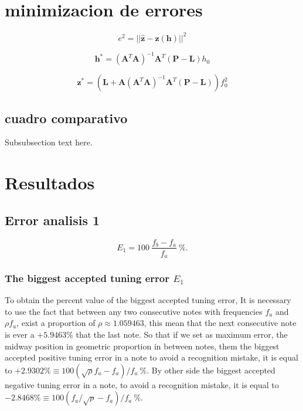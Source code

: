 \documentclass{article}
\begin{document}
\section{minimizacion de errores}

\begin{equation}
e^2= || \mathbf{\hat{z}} - \mathbf{z}(\mathbf{h}) ||^2
\end{equation}

\begin{equation}
\mathbf{h}^{*}=
 \left(\mathbf{A}^T\mathbf{A}\right)^{-1}\mathbf{A}^T
 \left(\mathbf{P}-\mathbf{L}\right)
h_0
\end{equation}


\begin{equation}
\mathbf{z}^{*}=
\left(\mathbf{L}
+\mathbf{A}\left(\mathbf{A}^T\mathbf{A}\right)^{-1}\mathbf{A}^T
 \left(\mathbf{P}-\mathbf{L}\right) \right)
f_0^2
\end{equation}

\subsection{cuadro comparativo}
Subsubsection text here.



\section{Resultados}

\subsection{Error analisis 1}
\begin{equation}
E_1=100~\frac{f_b-f_a}{f_a}~\%. 
\end{equation}

\subsubsection{The biggest accepted tuning error $E_1$}
\label{subsubsec:max:E1}
To obtain the percent value of the biggest accepted tuning error,
It is necessary to use the fact that between any two consecutive notes with frequencies
$f_a$ and $\rho f_a$, exist a proportion of $\rho\approx 1.059463$, this mean
that the next consecutive note is ever a $+5.9463\%$ that the last note. So that
if we set as maximum error, the midway position in geometric proportion in between notes, them 
the biggest accepted positive tuning error in a note  
to avoid a recognition mistake, it is equal to $+2.9302\% \equiv 100 (\sqrt{\rho}f_a-f_a)/f_a~\%$.
By other side 
the biggest accepted negative tuning error in a note, 
to avoid a recognition mistake, it is equal to $-2.8468\% \equiv 100 (f_a/\sqrt{\rho}-f_a)/f_a~\%$.
\end{document}
